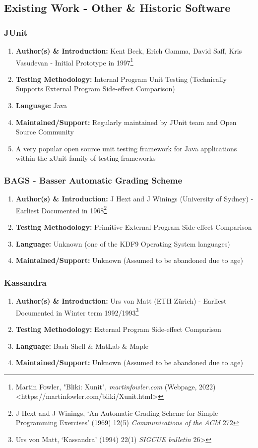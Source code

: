 \documentclass[xcolor]{beamer}
\begin{document}
\subsection{Existing Work - Other \& Historic Software}
\begin{frame}
	\frametitle{JUnit}
	\begin{enumerate}
		\setlength\itemsep{1em}
		\item \textbf{Author(s) \& Introduction:} Kent Beck, Erich Gamma, David Saff, Kris Vasudevan - Initial Prototype in 1997\footnote{Martin Fowler, "Bliki: Xunit", \textit{martinfowler.com} (Webpage, 2022) <https://martinfowler.com/bliki/Xunit.html>}
			\pause
		\item \textbf{Testing Methodology:} Internal Program Unit Testing (Technically Supports External Program Side-effect Comparison)
			\pause
		\item \textbf{Language:} Java
			\pause
		\item \textbf{Maintained/Support:} Regularly maintained by JUnit team and Open Source Community
			\pause 
		\item A very popular open source unit testing framework for Java applications within the xUnit family of testing frameworks
	\end{enumerate}
\end{frame}
\begin{frame}
	\frametitle{BAGS - Basser Automatic Grading Scheme}
	\begin{enumerate}
		\setlength\itemsep{1em}
		\item \textbf{Author(s) \& Introduction:} J Hext and J Winings (University of Sydney) - Earliest Documented in 1968\footnote{J Hext and J Winings, ‘An Automatic Grading Scheme for Simple Programming Exercises’ (1969) 12(5) \textit{Communications of the ACM} 272}
			\pause
		\item \textbf{Testing Methodology:} Primitive External Program Side-effect Comparison
			\pause
		\item \textbf{Language:} Unknown (one of the KDF9 Operating System languages)
			\pause
		\item \textbf{Maintained/Support:} Unknown (Assumed to be abandoned due to age)
	\end{enumerate}
\end{frame}
\begin{frame}
	\frametitle{Kassandra}
	\begin{enumerate}
		\setlength\itemsep{1em}
		\item \textbf{Author(s) \& Introduction:} Urs von Matt (ETH Zürich) - Earliest Documented in Winter term 1992/1993\footnote{Urs von Matt, ‘Kassandra’ (1994) 22(1) \textit{SIGCUE bulletin} 26>}
			\pause
		\item \textbf{Testing Methodology:} External Program Side-effect Comparison
			\pause
		\item \textbf{Language:} Bash Shell \& MatLab \& Maple
			\pause
		\item \textbf{Maintained/Support:} Unknown (Assumed to be abandoned due to age)
	\end{enumerate}
\end{frame}
\end{document}
